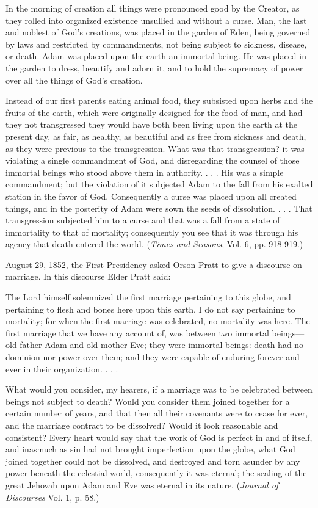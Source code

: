 In the morning of creation all things were pronounced good by the Creator, as they rolled
into organized existence unsullied and without a curse. Man, the last and noblest of God's
creations, was placed in the garden of Eden, being governed by laws and restricted by
commandments, not being subject to sickness, disease, or death. Adam was placed upon the
earth an immortal being. He was placed in the garden to dress, beautify and adorn it, and to
hold the supremacy of power over all the things of God's creation.

Instead of our first parents eating animal food, they subsisted upon herbs and the fruits of the
earth, which were originally designed for the food of man, and had they not transgressed they
would have both been living upon the earth at the present day, as fair, as healthy, as beautiful
and as free from sickness and death, as they were previous to the transgression. What was
that transgression? it was violating a single commandment of God, and disregarding the
counsel of those immortal beings who stood above them in authority. . . . His was a simple
commandment; but the violation of it subjected Adam to the fall from his exalted station in
the favor of God. Consequently a curse was placed upon all created things, and in the
posterity of Adam were sown the seeds of dissolution. . . . That transgression subjected him
to a curse and that was a fall from a state of immortality to that of mortality; consequently
you see that it was through his agency that death entered the world. (\textit{Times and Seasons}, Vol.
6, pp. 918-919.)

August 29, 1852, the First Presidency asked Orson Pratt to give a discourse on marriage. In
this discourse Elder Pratt said:

The Lord himself solemnized the first marriage pertaining to this globe, and pertaining to
flesh and bones here upon this earth. I do not say pertaining to mortality; for when the first
marriage was celebrated, no mortality was here. The first marriage that we have any account
of, was between two immortal beings—old father Adam and old mother Eve; they were
immortal beings: death had no dominion nor power over them; and they were capable of
enduring forever and ever in their organization. . . .

What would you consider, my hearers, if a marriage was to be celebrated between beings not
subject to death? Would you consider them joined together for a certain number of years, and
that then all their covenants were to cease for ever, and the marriage contract to be dissolved?
Would it look reasonable and consistent? Every heart would say that the work of God is
perfect in and of itself, and inasmuch as sin had not brought imperfection upon the globe,
what God joined together could not be dissolved, and destroyed and torn asunder by any
power beneath the celestial world, consequently it was eternal; the sealing of the great
Jehovah upon Adam and Eve was eternal in its nature. (\textit{Journal of Discourses} Vol. 1, p. 58.)

